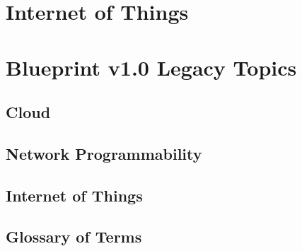 \documentclass{article}
\begin{document}
\newpage
\section{Internet of Things}
\renewcommand{\imgpath}{content/iot/a3a-archdeploy/img}






\newpage
\section{Blueprint v1.0 Legacy Topics}
\renewcommand{\imgpath}{content/legacy/img/}
\subsection{Cloud}



\subsection{Network Programmability}

\subsection{Internet of Things}


\newpage
\subsection{Glossary of Terms}

\end{document}
